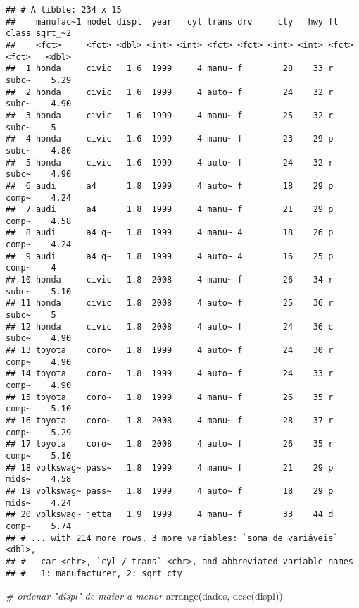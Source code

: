 \documentclass[
]{book}
\newenvironment{Shaded}{\begin{snugshade}}{\end{snugshade}}
\newcommand{\CommentTok}[1]{\textcolor[rgb]{0.56,0.35,0.01}{\textit{#1}}}
\newcommand{\FunctionTok}[1]{\textcolor[rgb]{0.00,0.00,0.00}{#1}}
\newcommand{\NormalTok}[1]{#1}
\begin{document}
\begin{verbatim}
## # A tibble: 234 x 15
##    manufac~1 model displ  year   cyl trans drv     cty   hwy fl    class sqrt_~2
##    <fct>     <fct> <dbl> <int> <int> <fct> <fct> <int> <int> <fct> <fct>   <dbl>
##  1 honda     civic   1.6  1999     4 manu~ f        28    33 r     subc~    5.29
##  2 honda     civic   1.6  1999     4 auto~ f        24    32 r     subc~    4.90
##  3 honda     civic   1.6  1999     4 manu~ f        25    32 r     subc~    5   
##  4 honda     civic   1.6  1999     4 manu~ f        23    29 p     subc~    4.80
##  5 honda     civic   1.6  1999     4 auto~ f        24    32 r     subc~    4.90
##  6 audi      a4      1.8  1999     4 auto~ f        18    29 p     comp~    4.24
##  7 audi      a4      1.8  1999     4 manu~ f        21    29 p     comp~    4.58
##  8 audi      a4 q~   1.8  1999     4 manu~ 4        18    26 p     comp~    4.24
##  9 audi      a4 q~   1.8  1999     4 auto~ 4        16    25 p     comp~    4   
## 10 honda     civic   1.8  2008     4 manu~ f        26    34 r     subc~    5.10
## 11 honda     civic   1.8  2008     4 auto~ f        25    36 r     subc~    5   
## 12 honda     civic   1.8  2008     4 auto~ f        24    36 c     subc~    4.90
## 13 toyota    coro~   1.8  1999     4 auto~ f        24    30 r     comp~    4.90
## 14 toyota    coro~   1.8  1999     4 auto~ f        24    33 r     comp~    4.90
## 15 toyota    coro~   1.8  1999     4 manu~ f        26    35 r     comp~    5.10
## 16 toyota    coro~   1.8  2008     4 manu~ f        28    37 r     comp~    5.29
## 17 toyota    coro~   1.8  2008     4 auto~ f        26    35 r     comp~    5.10
## 18 volkswag~ pass~   1.8  1999     4 manu~ f        21    29 p     mids~    4.58
## 19 volkswag~ pass~   1.8  1999     4 auto~ f        18    29 p     mids~    4.24
## 20 volkswag~ jetta   1.9  1999     4 manu~ f        33    44 d     comp~    5.74
## # ... with 214 more rows, 3 more variables: `soma de variáveis` <dbl>,
## #   car <chr>, `cyl / trans` <chr>, and abbreviated variable names
## #   1: manufacturer, 2: sqrt_cty
\end{verbatim}

\begin{Shaded}
\begin{Highlighting}[]
\CommentTok{\# ordenar "displ" de maior a  menor}
\FunctionTok{arrange}\NormalTok{(dados, }\FunctionTok{desc}\NormalTok{(displ))}
\end{Highlighting}
\end{Shaded}
\end{document}
